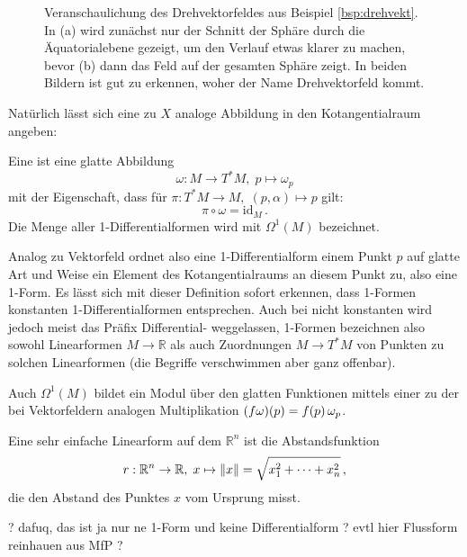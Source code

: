 \documentclass[../H_Analysis_main.tex]{subfiles}
\begin{document}
\begin{figure}[ht]
\centering
{}\hspace*{0.04\textwidth}

\caption[Veranschaulichung Drehvektorfeld]{Veranschaulichung des Drehvektorfeldes aus Beispiel \ref{bsp:drehvekt}. In (a) wird zunächst nur der Schnitt der Sphäre durch die Äquatorialebene gezeigt, um den Verlauf etwas klarer zu machen, bevor (b) dann das Feld auf der gesamten Sphäre zeigt. In beiden Bildern ist gut zu erkennen, woher der Name Drehvektorfeld kommt.}
\label{fig:drehvektfeldplot}
\end{figure}


Natürlich lässt sich eine zu $X$ analoge Abbildung in den Kotangentialraum angeben:
\begin{defi}
Eine  ist eine glatte Abbildung
\begin{equation}
\omega: M \rightarrow T^*M, \; p \mapsto \omega_p
\end{equation}
mit der Eigenschaft, dass für $\pi: T^*M \rightarrow M, \; (p, \alpha) \mapsto p$ gilt:
\begin{equation}
\pi \circ \omega = \text{id}_M \, .
\end{equation}
Die Menge aller 1-Differentialformen wird mit $\Omega^1(M)$ bezeichnet.
\end{defi}
Analog zu Vektorfeld ordnet also eine 1-Differentialform einem Punkt $p$ auf glatte Art und Weise ein Element des Kotangentialraums an diesem Punkt zu, also eine 1-Form. Es lässt sich mit dieser Definition sofort erkennen, dass 1-Formen konstanten 1-Differentialformen entsprechen. Auch bei nicht konstanten wird jedoch meist das Präfix Differential- weggelassen, 1-Formen bezeichnen also sowohl Linearformen $M \rightarrow \mathbb{R}$ als auch Zuordnungen $M \rightarrow T^* M$ von Punkten zu solchen Linearformen (die Begriffe verschwimmen aber ganz offenbar).

Auch $\Omega^1(M)$ bildet ein Modul über den glatten Funktionen mittels einer zu der bei Vektorfeldern analogen Multiplikation $\qty(f \omega)(p) = f(p) \, \omega_p$.


\begin{bsp}[Norm]
Eine sehr einfache Linearform auf dem $\mathbb{R}^n$ ist die Abstandsfunktion
\begin{equation}
r: \mathbb{R}^n \rightarrow \mathbb{R}, \; x \mapsto \norm{x} = \sqrt{x_1^2 + \dots + x_n^2} \, ,
\end{equation}
die den Abstand des Punktes $x$ vom Ursprung misst.

? dafuq, das ist ja nur ne 1-Form und keine Differentialform ? evtl hier Flussform reinhauen aus MfP ?
\end{bsp}
\end{document}
